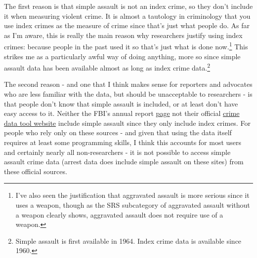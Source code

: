 \documentclass[
  12pt,
  openany]{book}
\begin{document}
The first reason is that simple assault is not an index crime, so they don't include it when measuring violent crime. It is almost a tautology in criminology that you use index crimes as the measure of crime since that's just what people do. As far as I'm aware, this is really the main reason why researchers justify using index crimes: because people in the past used it so that's just what is done now.\footnote{I've also seen the justification that aggravated assault is more serious since it uses a weapon, though as the SRS subcategory of aggravated assault without a weapon clearly shows, aggravated assault does not require use of a weapon.} This strikes me as a particularly awful way of doing anything, more so since simple assault data has been available almost as long as index crime data.\footnote{Simple assault is first available in 1964. Index crime data is available since 1960.}

The second reason - and one that I think makes sense for reporters and advocates who are less familiar with the data, but should be unacceptable to researchers - is that people don't know that simple assault is included, or at least don't have easy access to it. Neither the FBI's annual report \href{https://SRS.fbi.gov/crime-in-the-u.s/2019/crime-in-the-u.s.-2019/home}{page} not their official \href{https://crime-data-explorer.fr.cloud.gov/}{crime data tool website} include simple assault since they only include index crimes. For people who rely only on these sources - and given that using the data itself requires at least some programming skills, I think this accounts for most users and certainly nearly all non-researchers - it is not possible to access simple assault crime data (arrest data does include simple assault on these sites) from these official sources.
\end{document}
